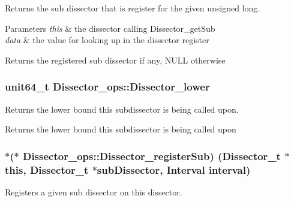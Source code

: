 Returns the sub dissector that is register for the given unsigned long. 


\begin{DoxyParams}{Parameters}
{\em this} & the dissector calling Dissector\+\_\+get\+Sub \\
\hline
{\em data} & the value for looking up in the dissector register\\
\hline
\end{DoxyParams}
\begin{DoxyReturn}{Returns}
the registered sub dissector if any, N\+U\+L\+L otherwise 
\end{DoxyReturn}
\hypertarget{struct_dissector__ops_a12f42148d4173471c21f3b33296d9256}{}
\subsubsection[{Dissector\+\_\+lower}]{\setlength{\rightskip}{0pt plus 5cm}unit64\+\_\+t Dissector\+\_\+ops\+::\+Dissector\+\_\+lower}\label{struct_dissector__ops_a12f42148d4173471c21f3b33296d9256}


Returns the lower bound this subdissector is being called upon. 

\begin{DoxyReturn}{Returns}
the lower bound this subdissector is being called upon 
\end{DoxyReturn}
\hypertarget{struct_dissector__ops_a66cf6888070f1e49cfa555ef28a96f8a}{}
\subsubsection[{Dissector\+\_\+register\+Sub}]{$\ast$($\ast$ Dissector\+\_\+ops\+::\+Dissector\+\_\+register\+Sub) ({\bf Dissector\+\_\+t} $\ast$this, {\bf Dissector\+\_\+t} $\ast$sub\+Dissector, Interval interval)}\label{struct_dissector__ops_a66cf6888070f1e49cfa555ef28a96f8a}


Registers a given sub dissector on this dissector. 


